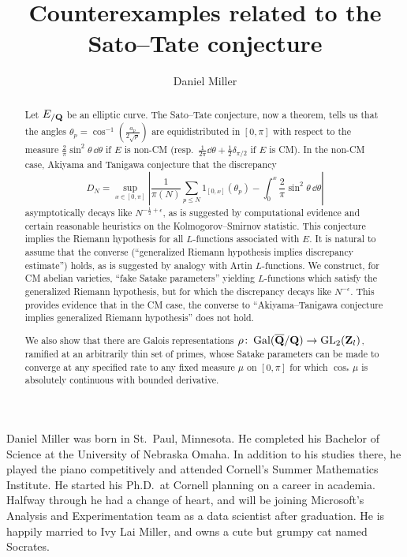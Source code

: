 \documentclass[phd,tocprelim]{cornell}
\title{Counterexamples related to the Sato--Tate conjecture}
\author{Daniel Miller}
\begin{document}
\maketitle
\makecopyright





\begin{abstract}
Let $E_{/\mathbf{Q}}$ be an elliptic curve. The Sato--Tate conjecture, now a theorem, 
tells us that the angles $\theta_p =\cos^{-1}\left(\frac{a_p}{2\sqrt p}\right)$ 
are equidistributed in $[0,\pi]$ with respect to the measure 
$\frac{2}{\pi}\sin^2\theta\, \dd\theta$ if $E$ is non-CM
(resp.~$\frac{1}{2\pi} \dd \theta + \frac 1 2 \delta_{\pi/2}$ if $E$ is CM). 
In the non-CM case, Akiyama and Tanigawa conjecture that the discrepancy 
\[
	D_N = \sup_{x\in [0,\pi]} \left| \frac{1}{\pi(N)} \sum_{p\leqslant N} 1_{[0,x]}(\theta_p) - \int_0^x \frac{2}{\pi}\sin^2\theta\, \dd\theta\right| 
\]
asymptotically decays like $N^{-\frac 1 2+\epsilon}$, as is suggested by computational 
evidence and certain reasonable heuristics on the Kolmogorov--Smirnov 
statistic. This conjecture implies the Riemann hypothesis 
for all $L$-functions associated with $E$. It is natural to assume that the 
converse (``generalized Riemann hypothesis implies discrepancy estimate'') holds, 
as is suggested by analogy with Artin $L$-functions. We construct, for CM abelian 
varieties, ``fake Satake parameters'' yielding $L$-functions which satisfy 
the generalized Riemann hypothesis, but for which the discrepancy decays like 
$N^{-\epsilon}$. This provides evidence that in the CM case, the converse to 
``Akiyama--Tanigawa conjecture implies generalized Riemann hypothesis'' does 
not hold. 

We also show that there are Galois representations 
$\rho\colon \operatorname{Gal}(\overline {\mathbf{Q}} /\mathbf{Q}) \to \operatorname{GL}_2(\mathbf{Z}_l)$, ramified at an 
arbitrarily thin set of primes, whose Satake parameters can be made to 
converge at any specified rate to any fixed measure $\mu$ on $[0,\pi]$ for 
which $\cos_\ast\mu$ is absolutely continuous with bounded derivative. 
\end{abstract}





\begin{biosketch}
Daniel Miller was born in St.~Paul, Minnesota. He completed his Bachelor of 
Science at the University of Nebraska Omaha. In addition to his studies there, 
he played the piano competitively and attended Cornell's Summer Mathematics 
Institute. He started his Ph.D.~at Cornell planning on a career in academia. 
Halfway through he had a change of heart, and will be joining Microsoft's 
Analysis and Experimentation team as a data scientist after graduation. He is 
happily married to Ivy Lai Miller, and owns a cute but grumpy cat named Socrates. 
\end{biosketch}
\end{document}
